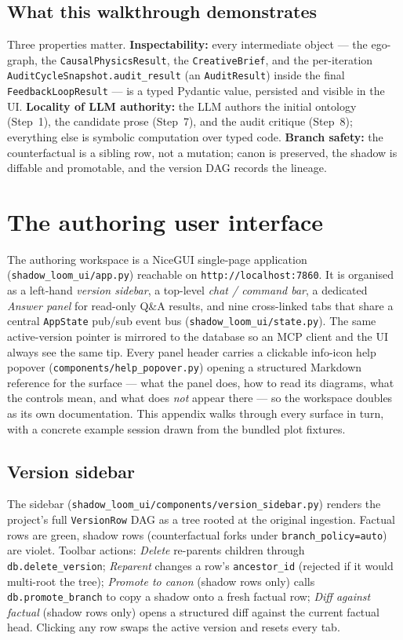 \documentclass[11pt]{article}
\begin{document}
\subsection{What this walkthrough demonstrates}
\label{app:wk-summary}

Three properties matter. \textbf{Inspectability:} every
intermediate object --- the ego-graph, the
\texttt{CausalPhysicsResult}, the \texttt{CreativeBrief}, and
the per-iteration \texttt{AuditCycleSnapshot.audit\_result}
(an \texttt{AuditResult}) inside the final
\texttt{FeedbackLoopResult} --- is a typed Pydantic value,
persisted and visible in the UI. \textbf{Locality of LLM authority:} the LLM
authors the initial ontology (Step~1), the candidate prose (Step~7),
and the audit critique (Step~8); everything else is symbolic
computation over typed code. \textbf{Branch safety:} the
counterfactual is a sibling row, not a mutation; canon is
preserved, the shadow is diffable and promotable, and the version
DAG records the lineage.


\section{The authoring user interface}
\label{app:ui}

The authoring workspace is a NiceGUI single-page application
(\texttt{shadow\_loom\_ui/app.py}) reachable on
\texttt{http://localhost:7860}. It is organised as a left-hand
\emph{version sidebar}, a top-level \emph{chat / command bar}, a
dedicated \emph{Answer panel} for read-only Q\&A results, and nine
cross-linked tabs that share a central \texttt{AppState} pub/sub event
bus (\texttt{shadow\_loom\_ui/state.py}). The same active-version
pointer is mirrored to the database so an MCP client and the UI always
see the same tip. Every panel header carries a clickable info-icon
help popover (\texttt{components/help\_popover.py}) opening a
structured Markdown reference for the surface --- what the panel does,
how to read its diagrams, what the controls mean, and what does
\emph{not} appear there --- so the workspace doubles as its own
documentation. This appendix walks through every surface in turn,
with a concrete example session drawn from the bundled plot fixtures.

\subsection{Version sidebar}
\label{app:ui-sidebar}

The sidebar
(\texttt{shadow\_loom\_ui/components/version\_sidebar.py})
renders the project's full \texttt{VersionRow} DAG as a tree
rooted at the original ingestion. Factual rows are green, shadow
rows (counterfactual forks under \texttt{branch\_policy=auto})
are violet. Toolbar actions: \emph{Delete} re-parents children
through \texttt{db.delete\_version}; \emph{Reparent} changes a
row's \texttt{ancestor\_id} (rejected if it would multi-root the
tree); \emph{Promote to canon} (shadow rows only) calls
\texttt{db.promote\_branch} to copy a shadow onto a fresh factual
row; \emph{Diff against factual} (shadow rows only) opens a
structured diff against the current factual head. Clicking any
row swaps the active version and resets every tab.
\end{document}
